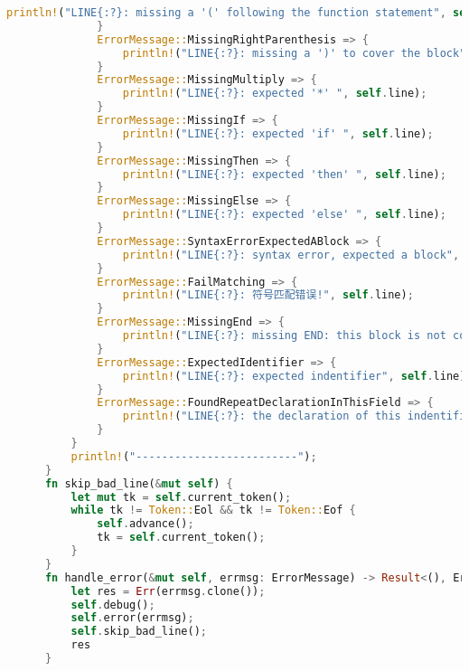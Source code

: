 \begin{lstlisting}[caption={语法分析器parse.rs}, label={4:code-example}, captionpos=t, language=rust]
                  println!("LINE{:?}: missing a '(' following the function statement", self.line);
              }
              ErrorMessage::MissingRightParenthesis => {
                  println!("LINE{:?}: missing a ')' to cover the block", self.line);
              }
              ErrorMessage::MissingMultiply => {
                  println!("LINE{:?}: expected '*' ", self.line);
              }
              ErrorMessage::MissingIf => {
                  println!("LINE{:?}: expected 'if' ", self.line);
              }
              ErrorMessage::MissingThen => {
                  println!("LINE{:?}: expected 'then' ", self.line);
              }
              ErrorMessage::MissingElse => {
                  println!("LINE{:?}: expected 'else' ", self.line);
              }
              ErrorMessage::SyntaxErrorExpectedABlock => {
                  println!("LINE{:?}: syntax error, expected a block", self.line);
              }
              ErrorMessage::FailMatching => {
                  println!("LINE{:?}: 符号匹配错误!", self.line);
              }
              ErrorMessage::MissingEnd => {
                  println!("LINE{:?}: missing END: this block is not covered", self.line);
              }
              ErrorMessage::ExpectedIdentifier => {
                  println!("LINE{:?}: expected indentifier", self.line);
              }
              ErrorMessage::FoundRepeatDeclarationInThisField => {
                  println!("LINE{:?}: the declaration of this indentifier repeated in this scope", self.line);
              }
          }
          println!("-------------------------");
      }
      fn skip_bad_line(&mut self) {
          let mut tk = self.current_token();
          while tk != Token::Eol && tk != Token::Eof {
              self.advance();
              tk = self.current_token();
          }
      }
      fn handle_error(&mut self, errmsg: ErrorMessage) -> Result<(), ErrorMessage>{
          let res = Err(errmsg.clone());
          self.debug();
          self.error(errmsg);
          self.skip_bad_line();
          res
      }
      

\end{lstlisting}
